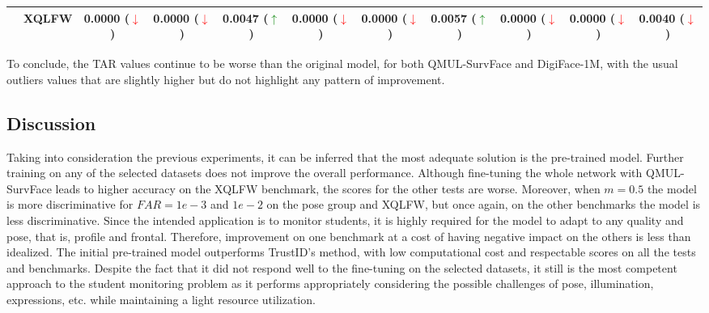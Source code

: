 \documentclass[class=report, crop=false, a4paper, 12pt]{standalone}
\begin{document}
\begin{table}[H]
{\begin{tabular}{cl|ccc|ccc|ccc|}
    \multicolumn{1}{|c|}{}                         & XQLFW    & \multicolumn{1}{c|}{0.0000 (\textcolor{red}{$\downarrow$})} & \multicolumn{1}{c|}{0.0000 (\textcolor{red}{$\downarrow$})} & 0.0047 (\textcolor{green}{$\uparrow$})   & \multicolumn{1}{c|}{0.0000 (\textcolor{red}{$\downarrow$})} & \multicolumn{1}{c|}{0.0000 (\textcolor{red}{$\downarrow$})} & 0.0057 (\textcolor{green}{$\uparrow$})   & \multicolumn{1}{c|}{0.0000 (\textcolor{red}{$\downarrow$})} & \multicolumn{1}{c|}{0.0000 (\textcolor{red}{$\downarrow$})} & 0.0040 (\textcolor{red}{$\downarrow$}) \\ \hline
    \end{tabular}%
    }
\end{table}

\par To conclude, the TAR values continue to be worse than the original model, for both QMUL-SurvFace and DigiFace-1M, with the usual outliers values that are slightly higher but do not highlight any pattern of improvement.

\subsection{Discussion}
\par Taking into consideration the previous experiments, it can be inferred that the most adequate solution is the pre-trained model. Further training on any of the selected datasets does not improve the overall performance. Although fine-tuning the whole network with QMUL-SurvFace leads to higher accuracy on the XQLFW benchmark, the scores for the other tests are worse. Moreover, when $m=0.5$ the model is more discriminative for $FAR=1e-3$ and $1e-2$ on the pose group and XQLFW, but once again, on the other benchmarks the model is less discriminative. Since the intended application is to monitor students, it is highly required for the model to adapt to any quality and pose, that is, profile and frontal. Therefore, improvement on one benchmark at a cost of having negative impact on the others is less than idealized. The initial pre-trained model outperforms TrustID's method, with low computational cost and respectable scores on all the tests and benchmarks. Despite the fact that it did not respond well to the fine-tuning on the selected datasets, it still is the most competent approach to the student monitoring problem as it performs appropriately considering the possible challenges of pose, illumination, expressions, etc. while maintaining a light resource utilization. 
\end{document}
